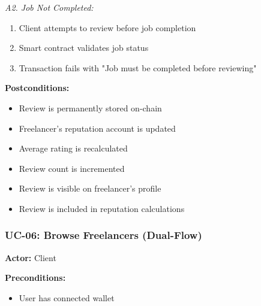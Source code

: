 \documentclass[a4paper,13pt,twoside]{report}
\theoremstyle{definition}
\begin{document}
\textit{A2. Job Not Completed:}
\begin{enumerate}
    \item Client attempts to review before job completion
    \item Smart contract validates job status
    \item Transaction fails with "Job must be completed before reviewing"
\end{enumerate}

\textbf{Postconditions:}
\begin{itemize}
    \item Review is permanently stored on-chain
    \item Freelancer's reputation account is updated
    \item Average rating is recalculated
    \item Review count is incremented
    \item Review is visible on freelancer's profile
    \item Review is included in reputation calculations
\end{itemize}

\subsubsection{UC-06: Browse Freelancers (Dual-Flow)}

\textbf{Actor:} Client

\textbf{Preconditions:}
\begin{itemize}
    \item User has connected wallet
\end{itemize}
\end{document}
